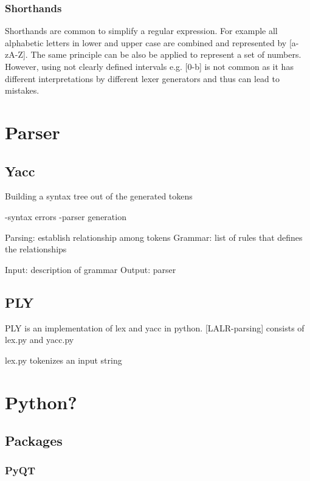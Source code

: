 \subsubsection{Shorthands}
Shorthands are common to simplify a regular expression.
For example all alphabetic letters in lower and upper case are combined and represented by [a-zA-Z].
The same principle can be also be applied to represent a set of numbers.
However, using not clearly defined intervals e.g. [0-b] is not common as it has different interpretations by different lexer generators and thus can lead to mistakes. \cite{Mogensen.2017}






\section{Parser}\label{sec:BackgroundParser}
\subsection{Yacc}\label{sec:BackgroundYacc}

Building a syntax tree out of the generated tokens \cite{Mogensen.2017}

-syntax errors
-parser generation

Parsing: establish relationship among tokens \cite{LexYacc.1992}
Grammar: list of rules that defines the relationships \cite{LexYacc.1992}

Input: description of grammar \cite{LexYacc.1992}
Output: parser \cite{LexYacc.1992}


\subsection{PLY}\label{sec:BackgroundPLY}

\acf{PLY} \cite{PLY} is an implementation of lex and yacc in python.
[LALR-parsing]
consists of lex.py and yacc.py

lex.py tokenizes an input string


\section{Python?}\label{sec:BackgroundPython}
\subsection{Packages}\label{sec:BackgroundPackages}
\subsubsection{PyQT}\label{sec:BackgroundPyQT}